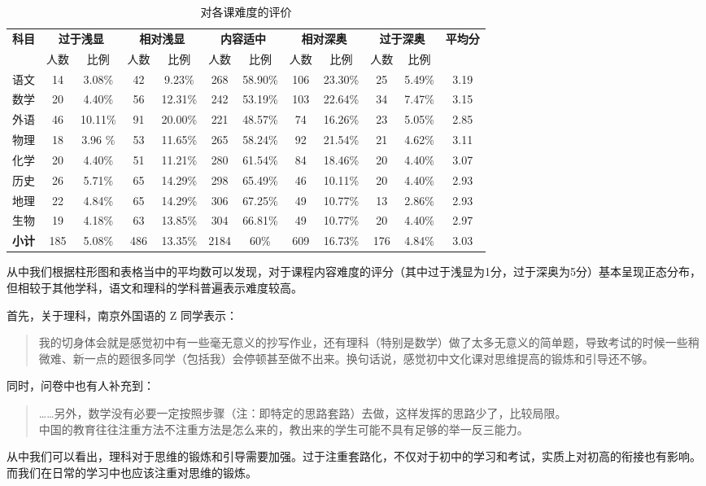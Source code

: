 \documentclass[12pt,UTF8]{ctexart}
\begin{document}
\begin{table}[!h]
	\centering
	\caption{对各课难度的评价}
	\label{fig:6}
	\begin{tabular}{c|cc|cc|cc|cc|cc|c}
		\hline
		\hline
		\multirow{2}{*}{\bf 科目} & \multicolumn{2}{c}{\bf 过于浅显} &
		\multicolumn{2}{c}{\bf 相对浅显} & \multicolumn{2}{c}{\bf 内容适中} &
		\multicolumn{2}{c}{\bf 相对深奥} & \multicolumn{2}{c|}{\bf 过于深奥} &
		\multirow{2}{*}{\bf 平均分} \\ 
		\cline{2-11}
		{} & 人数 & 比例 & 人数 & 比例 & 人数 & 比例 & 人数 & 比例 & 人数 & 比例 & {} \\ \hline
		语文 & 14 & 3.08\% & 42 & 9.23\% & 268 & 58.90\% & 106 & 23.30\% & 25 & 5.49\% &
		3.19 \\
		数学 & 20 & 4.40\% & 56 & 12.31\% & 242 & 53.19\% & 103 & 22.64\% & 34 & 7.47\%
		& 3.15 \\
		外语 & 46 & 10.11\% & 91 & 20.00\% & 221 & 48.57\% & 74 & 16.26\% & 23 & 5.05\%
		& 2.85 \\
		物理 & 18 & 3.96 \% & 53 & 11.65\% & 265 & 58.24\% & 92 & 21.54\% & 21 & 4.62\%
		& 3.11 \\
		化学 & 20 & 4.40\% & 51 & 11.21\% & 280 & 61.54\% & 84 & 18.46\% & 20 & 4.40\% &
		3.07  \\
		历史 & 26 & 5.71\% & 65 & 14.29\% & 298 & 65.49\% & 46 & 10.11\% & 20 & 4.40\% &
		2.93  \\
		地理 & 22 & 4.84\% & 65 & 14.29\% & 306 & 67.25\% & 49 & 10.77\% & 13 & 2.86\% &
		2.93  \\ 
		生物 & 19 & 4.18\% & 63 & 13.85\% & 304 & 66.81\% & 49 & 10.77\% & 20 & 4.40\% &
		2.97  \\ \hline
		{\bf 小计} & 185 & 5.08\% & 486 & 13.35\% & 2184 & 60\% & 609 & 16.73\% & 176 &
		4.84\% & 3.03  \\ 
		\hline
		\hline
	\end{tabular}
\end{table}
\par {
	
	从中我们根据柱形图和表格当中的平均数可以发现，对于课程内容难度的评分（其中过于浅显为1分，过于深奥为5分）基本呈现正态分布，但相较于其他学科，语文和理科的学科普遍表示难度较高。
}
\par {
	首先，关于理科，南京外国语的 Z 同学表示：
	\begin{quote}
		\kaishu
		我的切身体会就是感觉初中有一些毫无意义的抄写作业，还有理科（特别是数学）做了太多无意义的简单题，导致考试的时候一些稍微难、新一点的题很多同学（包括我）会停顿甚至做不出来。换句话说，感觉初中文化课对思维提高的锻炼和引导还不够。
	\end{quote}
	同时，问卷中也有人补充到：
	\begin{quote}
		\kaishu ……另外，数学没有必要一定按照步骤（注：即特定的思路套路）去做，这样发挥的思路少了，比较局限。\\
		中国的教育往往注重方法不注重方法是怎么来的，教出来的学生可能不具有足够的举一反三能力。
	\end{quote}
	
	从中我们可以看出，理科对于思维的锻炼和引导需要加强。过于注重套路化，不仅对于初中的学习和考试，实质上对初高的衔接也有影响。而我们在日常的学习中也应该注重对思维的锻炼。
}
\end{document}
